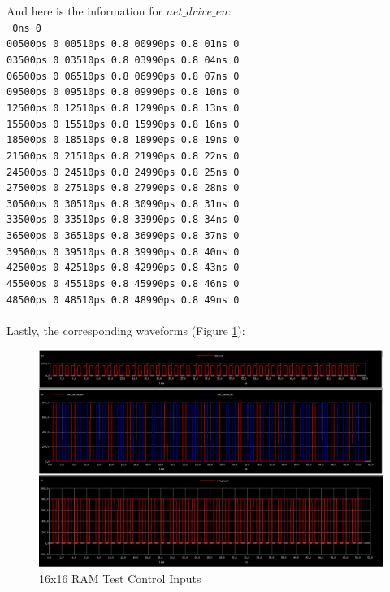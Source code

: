 \documentclass[a4paper]{article}
\def\code#1{\texttt{#1}}
\begin{document}
And here is the information for $net\_drive\_en$:\\
\code {
0ns 0\\
00500ps 0 00510ps 0.8 00990ps 0.8 01ns 0\\
03500ps 0 03510ps 0.8 03990ps 0.8 04ns 0\\
06500ps 0 06510ps 0.8 06990ps 0.8 07ns 0\\
09500ps 0 09510ps 0.8 09990ps 0.8 10ns 0\\
12500ps 0 12510ps 0.8 12990ps 0.8 13ns 0\\
15500ps 0 15510ps 0.8 15990ps 0.8 16ns 0\\
18500ps 0 18510ps 0.8 18990ps 0.8 19ns 0\\
21500ps 0 21510ps 0.8 21990ps 0.8 22ns 0\\
24500ps 0 24510ps 0.8 24990ps 0.8 25ns 0\\
27500ps 0 27510ps 0.8 27990ps 0.8 28ns 0\\
30500ps 0 30510ps 0.8 30990ps 0.8 31ns 0\\
33500ps 0 33510ps 0.8 33990ps 0.8 34ns 0\\
36500ps 0 36510ps 0.8 36990ps 0.8 37ns 0\\
39500ps 0 39510ps 0.8 39990ps 0.8 40ns 0\\
42500ps 0 42510ps 0.8 42990ps 0.8 43ns 0\\
45500ps 0 45510ps 0.8 45990ps 0.8 46ns 0\\
48500ps 0 48510ps 0.8 48990ps 0.8 49ns 0\\
}\\

Lastly, the corresponding waveforms (Figure \ref{fig:memory16x16TestWaveformCtlInputs}):

\begin{figure}[H]
	\centering
	\includegraphics[scale=0.25]{memory16x16TestWaveformCtlInputs}
	\caption{16x16 RAM Test Control Inputs}
	\label{fig:memory16x16TestWaveformCtlInputs}
\end{figure}
\end{document}
